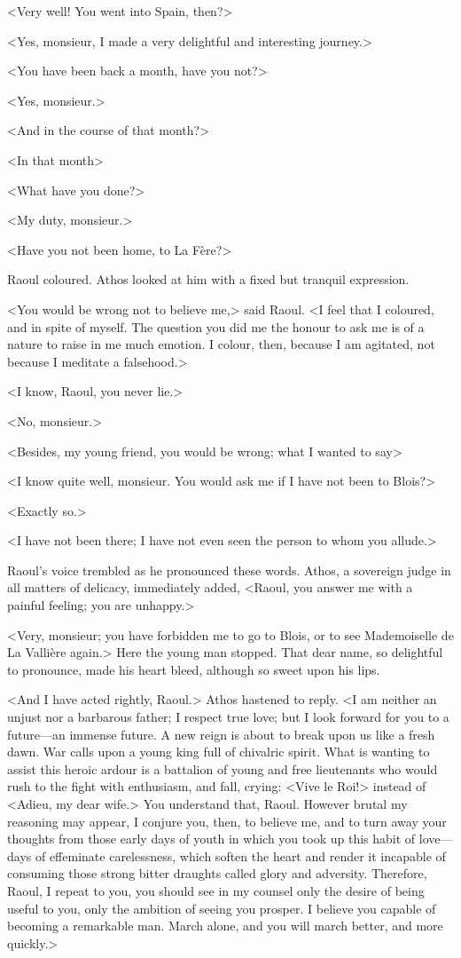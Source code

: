 <Very well! You went into Spain, then?>

<Yes, monsieur, I made a very delightful and interesting journey.>

<You have been back a month, have you not?>

<Yes, monsieur.>

<And in the course of that month?>

<In that month\longdash>

<What have you done?>

<My duty, monsieur.>

<Have you not been home, to La Fère?>

Raoul coloured. Athos looked at him with a fixed but tranquil expression.

<You would be wrong not to believe me,> said Raoul. <I feel that I coloured, and in spite of myself. The question you did me the honour to ask me is of a nature to raise in me much emotion. I colour, then, because I am agitated, not because I meditate a falsehood.>

<I know, Raoul, you never lie.>

<No, monsieur.>

<Besides, my young friend, you would be wrong; what I wanted to say\longdash>

<I know quite well, monsieur. You would ask me if I have not been to Blois?>

<Exactly so.>

<I have not been there; I have not even seen the person to whom you allude.>

Raoul's voice trembled as he pronounced these words. Athos, a sovereign judge in all matters of delicacy, immediately added, <Raoul, you answer me with a painful feeling; you are unhappy.>

<Very, monsieur; you have forbidden me to go to Blois, or to see Mademoiselle de La Vallière again.> Here the young man stopped. That dear name, so delightful to pronounce, made his heart bleed, although so sweet upon his lips.

<And I have acted rightly, Raoul.> Athos hastened to reply. <I am neither an unjust nor a barbarous father; I respect true love; but I look forward for you to a future—an immense future. A new reign is about to break upon us like a fresh dawn. War calls upon a young king full of chivalric spirit. What is wanting to assist this heroic ardour is a battalion of young and free lieutenants who would rush to the fight with enthusiasm, and fall, crying: <Vive le Roi!> instead of <Adieu, my dear wife.> You understand that, Raoul. However brutal my reasoning may appear, I conjure you, then, to believe me, and to turn away your thoughts from those early days of youth in which you took up this habit of love—days of effeminate carelessness, which soften the heart and render it incapable of consuming those strong bitter draughts called glory and adversity. Therefore, Raoul, I repeat to you, you should see in my counsel only the desire of being useful to you, only the ambition of seeing you prosper. I believe you capable of becoming a remarkable man. March alone, and you will march better, and more quickly.>

